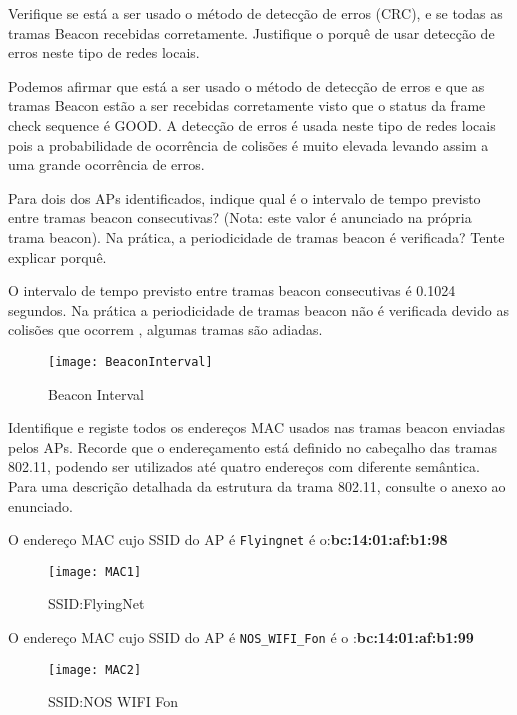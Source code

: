\documentclass{exam}
\begin{document}
\begin{questions}
\question Verifique se está a ser usado o método de detecção de erros (CRC), e se todas as tramas Beacon recebidas corretamente. Justifique o porquê de usar detecção de erros neste tipo de redes locais.
\begin{solution}
Podemos afirmar que está a ser usado o método de detecção de erros e que as tramas Beacon estão a ser recebidas corretamente visto que 
o status da frame check sequence é GOOD. A detecção de erros é usada neste tipo de redes locais pois a probabilidade de ocorrência de colisões é muito elevada levando assim a uma grande ocorrência de erros.
\end{solution}


\question Para dois dos APs identificados, indique qual é o intervalo de tempo previsto entre tramas beacon consecutivas? (Nota: este valor é anunciado na própria trama beacon). Na prática, a periodicidade de tramas beacon é verificada? Tente explicar porquê.
\begin{solution}
O intervalo de tempo previsto entre tramas beacon consecutivas é 0.1024 segundos.
Na prática a periodicidade de tramas beacon não é verificada devido as colisões que ocorrem , algumas tramas são adiadas.

\begin{figure}[H]
\centering\texttt{[image: BeaconInterval]} 
\caption{\label{fig:controller}Beacon Interval}
\end{figure}
\end{solution}

\question Identifique e registe todos os endereços MAC usados nas tramas beacon enviadas pelos APs. Recorde que o endereçamento está definido no cabeçalho das tramas 802.11, podendo ser utilizados até quatro endereços com diferente semântica. Para uma descrição detalhada da estrutura da trama 802.11, consulte o anexo ao enunciado.
\begin{solution}
O endereço MAC cujo SSID do AP é \verb|Flyingnet| é o:\textbf{bc:14:01:af:b1:98}
\begin{figure}[H]
\centering\texttt{[image: MAC1]} 
\caption{\label{fig:controller}SSID:FlyingNet}
\end{figure}
O endereço MAC cujo SSID do AP é \verb|NOS_WIFI_Fon| é o :\textbf{bc:14:01:af:b1:99}
\begin{figure}[H]
\centering\texttt{[image: MAC2]} 
\caption{\label{fig:controller}SSID:NOS WIFI Fon}
\end{figure}

\end{solution}


\end{questions}
\end{document}
